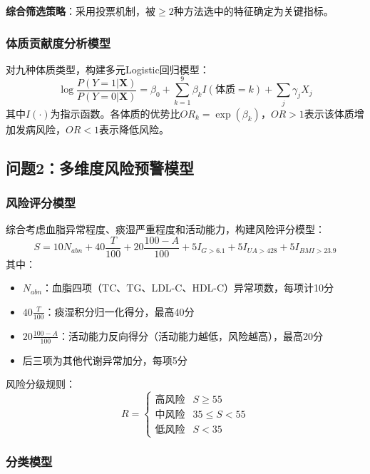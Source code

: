 \documentclass[12pt,a4paper]{ctexart}
\begin{document}
\textbf{综合筛选策略}：采用投票机制，被$\geq 2$种方法选中的特征确定为关键指标。

\subsubsection{体质贡献度分析模型}

对九种体质类型，构建多元Logistic回归模型：
\begin{equation}
    \log\frac{P(Y=1|\mathbf{X})}{P(Y=0|\mathbf{X})} = \beta_0 + \sum_{k=1}^{9}\beta_k I(\text{体质}=k) + \sum_{j}\gamma_j X_j
\end{equation}
其中$I(\cdot)$为指示函数。各体质的优势比$OR_k = \exp(\beta_k)$，$OR>1$表示该体质增加发病风险，$OR<1$表示降低风险。

\subsection{问题2：多维度风险预警模型}

\subsubsection{风险评分模型}

综合考虑血脂异常程度、痰湿严重程度和活动能力，构建风险评分模型：
\begin{equation}
    S = 10N_{abn} + 40\frac{T}{100} + 20\frac{100-A}{100} + 5I_{G>6.1} + 5I_{UA>428} + 5I_{BMI>23.9}
\end{equation}
其中：
\begin{itemize}
    \item $N_{abn}$：血脂四项（TC、TG、LDL-C、HDL-C）异常项数，每项计10分
    \item $40\frac{T}{100}$：痰湿积分归一化得分，最高40分
    \item $20\frac{100-A}{100}$：活动能力反向得分（活动能力越低，风险越高），最高20分
    \item 后三项为其他代谢异常加分，每项5分
\end{itemize}

风险分级规则：
\begin{equation}
    R = \begin{cases}
        \text{高风险} & S \geq 55 \\
        \text{中风险} & 35 \leq S < 55 \\
        \text{低风险} & S < 35
    \end{cases}
\end{equation}

\subsubsection{分类模型}
\end{document}
